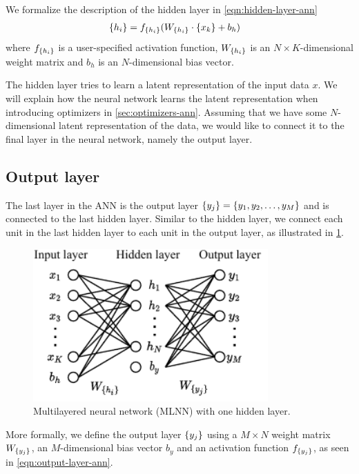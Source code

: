 We formalize the description of the hidden layer in \cref{eqn:hidden-layer-ann}
\begin{align}
    \label{eqn:hidden-layer-ann}
    \left\{ {h}_{i} \right\} &= f_{\left\{ {h}_{i} \right\}}(W_{\left\{ {h}_{i} \right\}} \cdot \left\{ {x}_{k} \right\} + b_h)
\end{align}
where $f_{\left\{ {h}_{i} \right\}}$ is a user-specified activation function, $W_{\left\{ {h}_{i} \right\}}$ is an $N \times K$-dimensional weight matrix and $b_h$ is an $N$-dimensional bias vector.

The hidden layer tries to learn a latent representation of the input data $x$. We will explain how the neural network learns the latent representation when introducing optimizers in \cref{sec:optimizers-ann}. Assuming that we have some $N$-dimensional latent representation of the data, we would like to connect it to the final layer in the neural network, namely the output layer.

\subsection{Output layer}
The last layer in the ANN is the output layer $\left\{ {y}_{j} \right\} = \left\{ y_1, y_2, \ldots, y_M \right\}$ and is connected to the last hidden layer. Similar to the hidden layer, we connect each unit in the last hidden layer to each unit in the output layer, as illustrated in \cref{fig:mlnn-one-hidden}.

\begin{figure}[H]
    \centering
    \includegraphics[width=9cm]{thesis/figures/artificial-neural-network_cropped.pdf}
    \caption{Multilayered neural network (MLNN) with one hidden layer.}
    \label{fig:mlnn-one-hidden}
\end{figure}

More formally, we define the output layer $\left\{ {y}_{j} \right\}$ using a $M \times N$ weight matrix $W_{\left\{ {y}_{j} \right\}}$, an $M$-dimensional bias vector $b_y$ and an activation function $f_{\left\{ {y}_{j} \right\}}$, as seen in \cref{eqn:output-layer-ann}.

